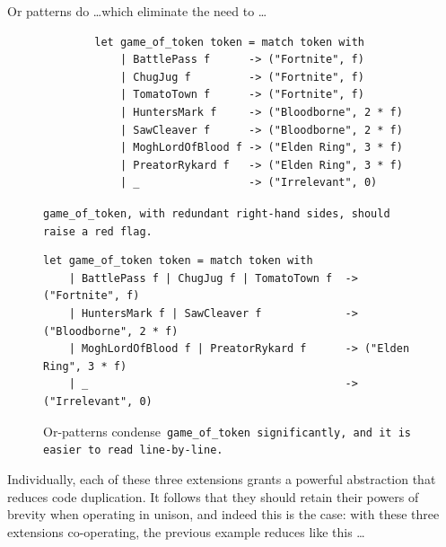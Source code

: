 \documentclass[manuscript,screen,12pt, nonacm]{acmart}
\begin{document}
    Or patterns do \dots which eliminate the need to \dots

     \begin{figure}
            \begin{center}
                \begin{verbatim}
        let game_of_token token = match token with 
            | BattlePass f      -> ("Fortnite", f)
            | ChugJug f         -> ("Fortnite", f)
            | TomatoTown f      -> ("Fortnite", f)
            | HuntersMark f     -> ("Bloodborne", 2 * f)
            | SawCleaver f      -> ("Bloodborne", 2 * f)
            | MoghLordOfBlood f -> ("Elden Ring", 3 * f)
            | PreatorRykard f   -> ("Elden Ring", 3 * f)
            | _                 -> ("Irrelevant", 0)
                \end{verbatim}
            \end{center}    

        \caption{\tt{game\_of\_token}, with redundant right-hand sides,
        should raise a red flag.} 
        \label{fig:baregot}
        \end{figure}


          \begin{figure}
    \begin{center}
    \begin{verbatim}
let game_of_token token = match token with 
    | BattlePass f | ChugJug f | TomatoTown f  -> ("Fortnite", f)
    | HuntersMark f | SawCleaver f             -> ("Bloodborne", 2 * f)
    | MoghLordOfBlood f | PreatorRykard f      -> ("Elden Ring", 3 * f)
    | _                                        -> ("Irrelevant", 0)
    \end{verbatim}
    \end{center}    
    \caption{Or-patterns condense~\tt{game\_of\_token}
    significantly, and it is easier to read line-by-line.} 
    \label{fig:orgot}
    \end{figure}

    \newpage
    Individually, each of these three extensions grants a powerful abstraction
    that reduces code duplication. It follows that they should retain their
    powers of brevity when operating in unison, and indeed this is the case:
    with these three extensions co-operating, the previous example reduces like
    this \dots
\end{document}
